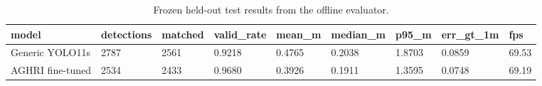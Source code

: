 \begin{table}[t]
\centering
\small
\begin{tabular}{lllllllll}
\hline
model & detections & matched & valid\_rate & mean\_m & median\_m & p95\_m & err\_gt\_1m & fps \\
\hline
Generic YOLO11s & 2787 & 2561 & 0.9218 & 0.4765 & 0.2038 & 1.8703 & 0.0859 & 69.53 \\
AGHRI fine-tuned & 2534 & 2433 & 0.9680 & 0.3926 & 0.1911 & 1.3595 & 0.0748 & 69.19 \\
\hline
\end{tabular}
\caption{Frozen held-out test results from the offline evaluator.}
\label{tab:T2_overall_results}
\end{table}
